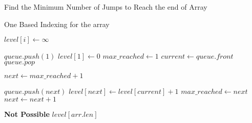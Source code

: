 \documentclass[12pt]{article}
\begin{document}
\section*{}

\begin{algorithm}

  \caption{Find the Minimum Number of Jumps to Reach the end of Array}
  
  \begin{algorithmic}[1]
    \Ensure One Based Indexing for the array
    \Statex
    
    
            \State $level[i] \gets \infty$
        \EndFor
        
        \State $queue.push(1)$
        \State $level[1] \gets 0$
        \State $max\_reached \gets 1$ 
            \State $current \gets queue.front$
            \State $queue.pop$
            
            \State $next \gets max\_reached + 1$
            
                \State $queue.push(next)$
                \State $level[next] \gets level[current] + 1$
                \State $max\_reached \gets next$
                \State $next \gets next + 1$
            \EndWhile
        \EndWhile
        
            \State \textbf{Not Possible}
        \Else
            \State \Return $level[arr.len]$
        \EndIf
        
    \EndFunction
  \end{algorithmic}
  
\end{algorithm}
\end{document}
